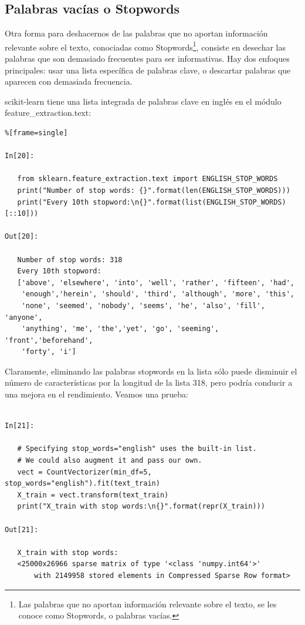 \subsection{Palabras vacías o Stopwords}

Otra forma para deshacernos de las palabras que no aportan información relevante
sobre el texto, conociadas como Stopwords\footnote{Las palabras que no aportan información relevante sobre el texto, se les conoce como Stopwords, o palabras vacías.}, consiste en desechar las palabras  que son demasiado frecuentes para ser informativas.  Hay dos enfoques principales: usar una lista específica de palabras clave, o descartar palabras que aparecen  con demasiada frecuencia.

 {\ttfamily scikit-learn} tiene una lista integrada de palabras  clave en inglés  en el módulo {\ttfamily feature\_extraction.text}:


\begin{lstlisting}%[frame=single]

In[20]:

   from sklearn.feature_extraction.text import ENGLISH_STOP_WORDS
   print("Number of stop words: {}".format(len(ENGLISH_STOP_WORDS)))
   print("Every 10th stopword:\n{}".format(list(ENGLISH_STOP_WORDS)[::10]))

Out[20]:

   Number of stop words: 318
   Every 10th stopword:
   ['above', 'elsewhere', 'into', 'well', 'rather', 'fifteen', 'had',
    'enough','herein', 'should', 'third', 'although', 'more', 'this',
    'none', 'seemed', 'nobody', 'seems', 'he', 'also', 'fill', 'anyone',
    'anything', 'me', 'the','yet', 'go', 'seeming', 'front','beforehand', 
    'forty', 'i']

\end{lstlisting}


Claramente, eliminando  las palabras  stopwords  en la lista sólo puede disminuir el número de 
características por la longitud de la lista 318, pero podría conducir a una 
mejora en el rendimiento. Veamos una  prueba:

\begin{lstlisting}

In[21]:

   # Specifying stop_words="english" uses the built-in list.
   # We could also augment it and pass our own.
   vect = CountVectorizer(min_df=5, stop_words="english").fit(text_train)
   X_train = vect.transform(text_train)
   print("X_train with stop words:\n{}".format(repr(X_train)))

Out[21]:

   X_train with stop words:
   <25000x26966 sparse matrix of type '<class 'numpy.int64'>'
       with 2149958 stored elements in Compressed Sparse Row format>

\end{lstlisting}

